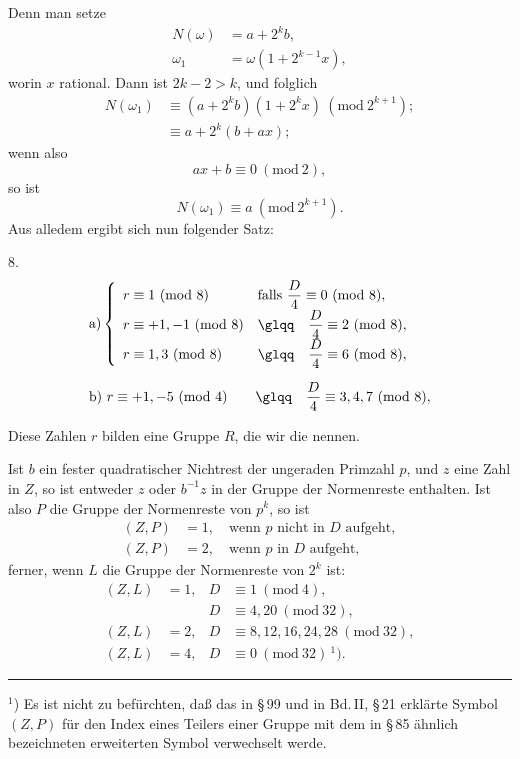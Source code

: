 Denn man setze
\[
\begin{aligned}
N(\omega) &= a + 2^k b,\\
\omega_1 &= \omega (1 + 2^{k-1} x),
\end{aligned}
\]
worin $x$ rational. Dann ist $2k - 2 > k$, und folglich
\[
\begin{aligned}
N(\omega_1) &\equiv (a + 2^k b)(1 + 2^k x) \ (\mathrm{mod}\ 2^{k+1});\\
&\equiv a + 2^k (b + a x);
\end{aligned}
\]
wenn also
\[
a x + b \equiv 0 \ (\mathrm{mod}\ 2),
\]
so ist
\[
N(\omega_1) \equiv a \ (\mathrm{mod}\ 2^{k+1}).
\]
Aus alledem ergibt sich nun folgender Satz:

8. 
\[
\begin{aligned}
& \text{a)} \left\{
\begin{array}{ll}
r \equiv 1 \ (\mathrm{mod}\ 8) & \text{falls } \dfrac{D}{4} \equiv 0 \ (\mathrm{mod}\ 8),\\[4pt]
r \equiv +1, -1 \ (\mathrm{mod}\ 8) & \text{\glqq}\quad \dfrac{D}{4} \equiv 2 \ (\mathrm{mod}\ 8),\\[4pt]
r \equiv 1, 3 \ (\mathrm{mod}\ 8) & \text{\glqq}\quad \dfrac{D}{4} \equiv 6 \ (\mathrm{mod}\ 8),
\end{array}
\right. \\[6pt]
& \text{b)}\ r \equiv +1, -5 \ (\mathrm{mod}\ 4) \qquad \text{\glqq}\quad \dfrac{D}{4} \equiv 3, 4, 7 \ (\mathrm{mod}\ 8),
\end{aligned}
\]

Diese Zahlen $r$ bilden eine Gruppe $R$, die wir die  nennen.

Ist $b$ ein fester quadratischer Nichtrest der ungeraden Primzahl $p$, und $z$ eine Zahl in $Z$, so ist entweder $z$ oder $b^{-1} z$ in der Gruppe der Normenreste enthalten. Ist also $P$ die Gruppe der Normenreste von $p^k$, so ist
\[
\begin{aligned}
(Z, P) &= 1, \quad \text{wenn } p \text{ nicht in } D \text{ aufgeht},\\
(Z, P) &= 2, \quad \text{wenn } p \text{ in } D \text{ aufgeht},
\end{aligned}
\]
ferner, wenn $L$ die Gruppe der Normenreste von $2^k$ ist:
\[
\begin{aligned}
(Z, L) &= 1, & D &\equiv 1 \ (\mathrm{mod}\ 4),\\
& & D &\equiv 4, 20 \ (\mathrm{mod}\ 32),\\
(Z, L) &= 2, & D &\equiv 8, 12, 16, 24, 28 \ (\mathrm{mod}\ 32),\\
(Z, L) &= 4, & D &\equiv 0 \ (\mathrm{mod}\ 32)\,^{1}).
\end{aligned}
\]

\par\noindent\rule{4cm}{0.4pt}\par
$^{1}$) Es ist nicht zu befürchten, daß das in \S\,99 und in Bd.\,II, \S\,21 erklärte Symbol $(Z, P)$ für den Index eines Teilers einer Gruppe mit dem in \S\,85 ähnlich bezeichneten erweiterten  Symbol verwechselt werde.
